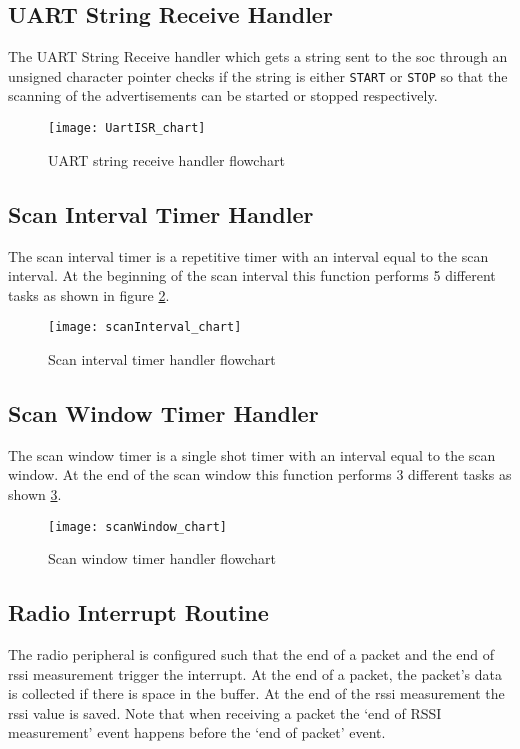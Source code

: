 \subsection{UART String Receive Handler}
The UART String Receive handler which gets a string sent to the \gls{soc} through an unsigned character pointer checks if the string is either \texttt{START} or \texttt{STOP} so that the scanning of the advertisements can be started or stopped respectively.
\begin{figure}[h]
\centering
\vspace{50pt}
\texttt{[image: UartISR\_chart]}
\caption{UART string receive handler flowchart}
\vspace{51pt}
\label{fig:UartISR_chart}
\end{figure}
\clearpage

\subsection{Scan Interval Timer Handler}
The scan interval timer is a repetitive timer with an interval equal to the scan interval. At the beginning of the scan interval this function performs 5 different tasks as shown in figure \ref{fig:scanInterval_chart}.
\begin{figure}[h]
\centering
\vspace{20pt}
\texttt{[image: scanInterval\_chart]}
\caption{Scan interval timer handler flowchart}
\label{fig:scanInterval_chart}
\end{figure}

\subsection{Scan Window Timer Handler}
The scan window timer is a single shot timer with an interval equal to the scan window. At the end of the scan window this function performs 3 different tasks as shown \ref{fig:scanWindow_chart}.
\begin{figure}[h]
\centering
\vspace{20pt}
\texttt{[image: scanWindow\_chart]}
\caption{Scan window timer handler flowchart}
\label{fig:scanWindow_chart}
\end{figure}
\clearpage

\subsection{Radio Interrupt Routine}
The radio peripheral is configured such that the end of a packet and the end of \acrshort{rssi} measurement trigger the interrupt. At the end of a packet, the packet's data is collected if there is space in the buffer. At the end of the \acrshort{rssi} measurement the \acrshort{rssi} value is saved. Note that when receiving a packet the `end of RSSI measurement' event happens before the `end of packet' event. 

